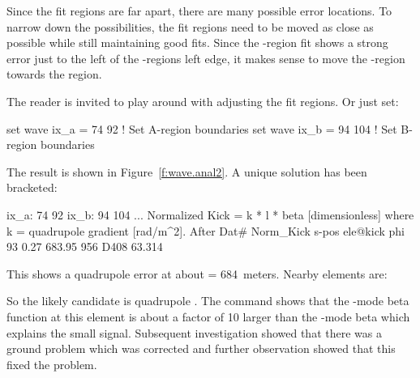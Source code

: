 \documentclass{hitec}     %
\begin{document}
Since the fit regions are far apart, there are many possible error locations. To narrow down the
possibilities, the fit regions need to be moved as close as possible while still maintaining good
fits. Since the -region fit shows a strong error just to the left of the -regions left
edge, it makes sense to move the -region towards the  region.

The reader is invited to play around with adjusting the fit regions. Or just set:
\begin{code}
set wave ix_a = 74 92    ! Set A-region boundaries
set wave ix_b = 94 104   ! Set B-region boundaries
\end{code}
The result is shown in Figure~\ref{f:wave.anal2}. A unique solution has been bracketed:
\begin{code}
ix_a:  74  92
ix_b:  94 104
...
Normalized Kick = k * l * beta [dimensionless]
   where k = quadrupole gradient [rad/m^2].
After Dat#    Norm_Kick     s-pos   ele@kick                    phi
       93          0.27    683.95   956   D408                 63.314
\end{code}
This shows a quadrupole error at about  = 684~meters. Nearby elements are:
So the likely candidate is quadrupole . The  command shows that the
-mode beta function at this element is about a factor of 10 larger than the -mode beta
which explains the small  signal. Subsequent investigation showed that there was a
ground problem which was corrected and further observation showed that this fixed the problem.
\end{document}
